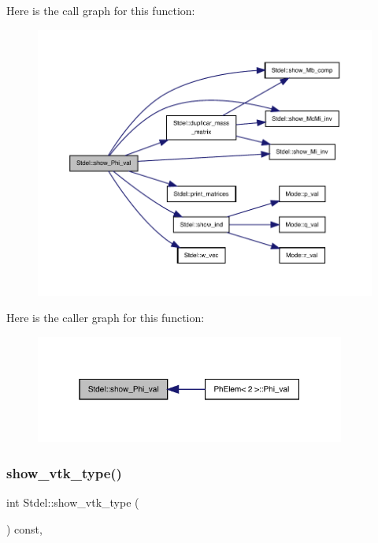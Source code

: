 Here is the call graph for this function\+:
\nopagebreak
\begin{figure}[H]
\begin{center}
\leavevmode
\includegraphics[width=350pt]{classStdel_a6565c36150823a1f52a2daf05806f7a4_cgraph}
\end{center}
\end{figure}
Here is the caller graph for this function\+:
\nopagebreak
\begin{figure}[H]
\begin{center}
\leavevmode
\includegraphics[width=289pt]{classStdel_a6565c36150823a1f52a2daf05806f7a4_icgraph}
\end{center}
\end{figure}
\mbox{\label{classStdel_a56288a857b95a55c8b7eb5b473e836d9}} 
\subsubsection{\texorpdfstring{show\+\_\+vtk\+\_\+type()}{show\_vtk\_type()}}
{\footnotesize\ttfamily int Stdel\+::show\+\_\+vtk\+\_\+type (\begin{DoxyParamCaption}{ }\end{DoxyParamCaption}) const\hspace{0.3cm}{\ttfamily [inline]}, {\ttfamily [inherited]}}




